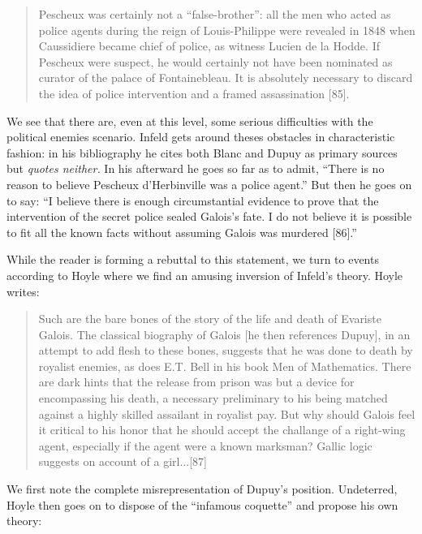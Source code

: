 \documentclass[12pt]{article}
\begin{document}
\begin{quote}
Pescheux was certainly not a ``false-brother'': all the men who acted as police agents during the reign of Louis-Philippe were revealed in 1848 when Caussidiere became chief of police, as witness Lucien de la Hodde. If Pescheux were suspect, he would certainly not have been nominated as curator of the palace of Fontainebleau. It is absolutely necessary to discard the idea of police intervention and a framed assassination [85].
\end{quote}
We see that there are, even at this level, some serious difficulties with the political enemies scenario. Infeld gets around theses obstacles in characteristic fashion: in his bibliography he cites both Blanc and Dupuy as primary sources but {\it quotes neither.} In his afterward he goes so far as to admit, ``There is no reason to believe Pescheux d'Herbinville was a police agent.'' But then he goes on to say: ``I believe there is enough circumstantial evidence to prove that the intervention of the secret police sealed Galois's fate. I do not believe it is possible to fit all the known facts without assuming Galois was murdered [86].''

While the reader is forming a rebuttal to this statement, we turn to events according to Hoyle where we find an amusing inversion of Infeld's theory. Hoyle writes:

\begin{quote}
Such are the bare bones of the story of the life and death of Evariste Galois. The classical biography of Galois [he then references Dupuy], in an attempt to add flesh to these bones, suggests that he was done to death by royalist enemies, as does E.T. Bell in his book Men of Mathematics. There are dark hints that the release from prison was but a device for encompassing his death, a necessary preliminary to his being matched against a highly skilled assailant in royalist pay. But why should Galois feel it critical to his honor that he should accept the challange of a right-wing agent, especially if the agent were a known marksman? Gallic logic suggests on account of a girl...[87]
\end{quote}
We first note the complete misrepresentation of Dupuy's position. Undeterred, Hoyle then goes on to dispose of the ``infamous coquette'' and propose his own theory:
\end{document}
